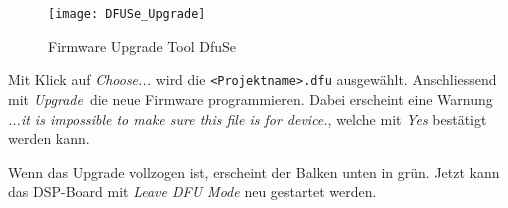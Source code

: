 \begin{figure}[H]
	\centering
	\texttt{[image: DFUSe\_Upgrade]}
	\caption{Firmware Upgrade Tool DfuSe}
	\label{pic:DFUSe_Upgrade}
\end{figure}

Mit Klick auf \textit{\glqq Choose...\grqq} wird die \texttt{<Projektname>.dfu} ausgewählt.
Anschliessend mit \glqq\textit{Upgrade}\grqq \ die neue Firmware programmieren.
Dabei erscheint eine Warnung \textit{\glqq ...it is impossible to make sure this file is for device.\grqq}, welche mit \textit{\glqq Yes\grqq} bestätigt werden kann.

Wenn das Upgrade vollzogen ist, erscheint der Balken unten in grün. Jetzt kann das DSP-Board mit \textit{\glqq Leave DFU Mode\grqq} neu gestartet werden.


